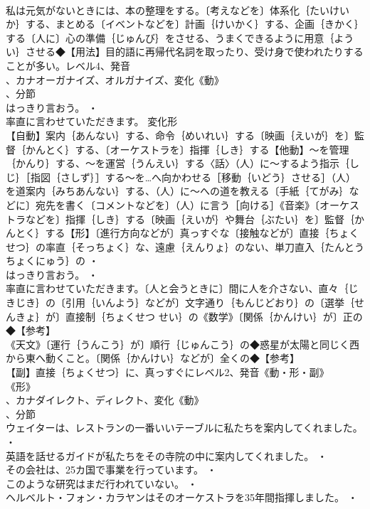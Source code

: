 \documentclass[8pt]{extreport}
\begin{document}
\begin{CJK}{UTF8}{min}
\\	私は元気がないときには、本の整理をする。〔考えなどを〕体系化｛たいけい か｝する、まとめる〔イベントなどを〕計画｛けいかく｝する、企画｛きかく｝する〔人に〕心の準備｛じゅんび｝をさせる、うまくできるように用意｛ようい｝させる◆【用法】目的語に再帰代名詞を取ったり、受け身で使われたりすることが多い。レベル4、発音
\\	、カナオーガナイズ、オルガナイズ、変化《動》
\\	、分節
\\	はっきり言おう。 ・
\\	率直に言わせていただきます。	変化形 
\\	【自動】案内｛あんない｝する、命令｛めいれい｝する〔映画｛えいが｝を〕監督｛かんとく｝する、〔オーケストラを〕指揮｛しき｝する【他動】～を管理｛かんり｝する、～を運営｛うんえい｝する〈話〉（人）に～するよう指示｛しじ｝［指図｛さしず｝］する～を…へ向かわせる［移動｛いどう｝させる］（人）を道案内｛みちあんない｝する、（人）に～への道を教える〔手紙｛てがみ｝などに〕宛先を書く〔コメントなどを〕（人）に言う［向ける］《音楽》〔オーケストラなどを〕指揮｛しき｝する〔映画｛えいが｝や舞台｛ぶたい｝を〕監督｛かんとく｝する【形】〔進行方向などが〕真っすぐな〔接触などが〕直接｛ちょくせつ｝の率直｛そっちょく｝な、遠慮｛えんりょ｝のない、単刀直入｛たんとう ちょくにゅう｝の ・
\\	はっきり言おう。 ・
\\	率直に言わせていただきます。〔人と会うときに〕間に人を介さない、直々｛じきじき｝の〔引用｛いんよう｝などが〕文字通り｛もんじどおり｝の〔選挙｛せんきょ｝が〕直接制｛ちょくせつ せい｝の《数学》〔関係｛かんけい｝が〕正の◆【参考】
\\	《天文》〔運行｛うんこう｝が〕順行｛じゅんこう｝の◆惑星が太陽と同じく西から東へ動くこと。〔関係｛かんけい｝などが〕全くの◆【参考】
\\	【副】直接｛ちょくせつ｝に、真っすぐにレベル2、発音《動・形・副》
\\	《形》
\\	、カナダイレクト、ディレクト、変化《動》
\\	、分節
\\	ウェイターは、レストランの一番いいテーブルに私たちを案内してくれました。 ・
\\	英語を話せるガイドが私たちをその寺院の中に案内してくれました。 ・
\\	その会社は、25カ国で事業を行っています。 ・
\\	このような研究はまだ行われていない。 ・
\\	ヘルベルト・フォン・カラヤンはそのオーケストラを35年間指揮しました。 ・

\end{CJK}
\end{document}
